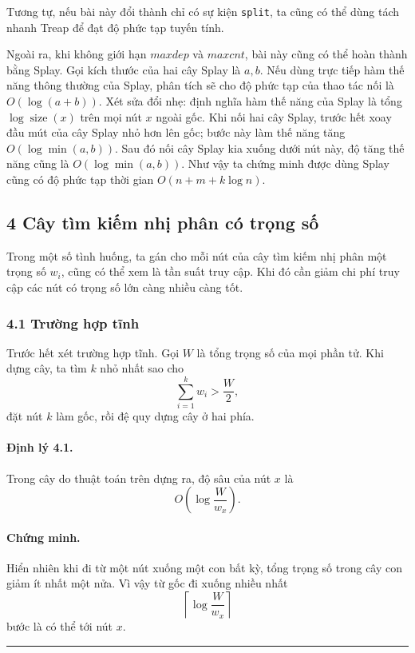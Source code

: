 \documentclass[11pt]{article}
\newcommand{\qedmark}{\hfill\rule{0.7ex}{0.7ex}}
\begin{document}
Tương tự, nếu bài này đổi thành chỉ có sự kiện \texttt{split}, ta cũng có thể
dùng tách nhanh Treap để đạt độ phức tạp tuyến tính.

Ngoài ra, khi không giới hạn \(\textit{maxdep}\) và \(\textit{maxcnt}\), bài
này cũng có thể hoàn thành bằng Splay. Gọi kích thước của hai cây Splay là
\(a,b\). Nếu dùng trực tiếp hàm thế năng thông thường của Splay, phân tích sẽ
cho độ phức tạp của thao tác nối là \(O(\log(a+b))\). Xét sửa đổi nhẹ: định
nghĩa hàm thế năng của Splay là tổng \(\log \operatorname{size}(x)\) trên mọi
nút \(x\) ngoài gốc. Khi nối hai cây Splay, trước hết xoay đầu mút của cây
Splay nhỏ hơn lên gốc; bước này làm thế năng tăng \(O(\log\min(a,b))\). Sau đó
nối cây Splay kia xuống dưới nút này, độ tăng thế năng cũng là
\(O(\log\min(a,b))\). Như vậy ta chứng minh được dùng Splay cũng có độ phức tạp
thời gian \(O(n+m+k\log n)\).

\subsection*{4 Cây tìm kiếm nhị phân có trọng số}

Trong một số tình huống, ta gán cho mỗi nút của cây tìm kiếm nhị phân một trọng
số \(w_i\), cũng có thể xem là tần suất truy cập. Khi đó cần giảm chi phí truy
cập các nút có trọng số lớn càng nhiều càng tốt.

\subsubsection*{4.1 Trường hợp tĩnh}

Trước hết xét trường hợp tĩnh. Gọi \(W\) là tổng trọng số của mọi phần tử. Khi
dựng cây, ta tìm \(k\) nhỏ nhất sao cho
\[
  \sum_{i=1}^{k}w_i>\frac{W}{2},
\]
đặt nút \(k\) làm gốc, rồi đệ quy dựng cây ở hai phía.

\paragraph{Định lý 4.1.}
Trong cây do thuật toán trên dựng ra, độ sâu của nút \(x\) là
\[
  O\left(\log\frac{W}{w_x}\right).
\]

\paragraph{Chứng minh.}
Hiển nhiên khi đi từ một nút xuống một con bất kỳ, tổng trọng số trong cây con
giảm ít nhất một nửa. Vì vậy từ gốc đi xuống nhiều nhất
\[
  \left\lceil\log\frac{W}{w_x}\right\rceil
\]
bước là có thể tới nút \(x\). \qedmark
\end{document}
